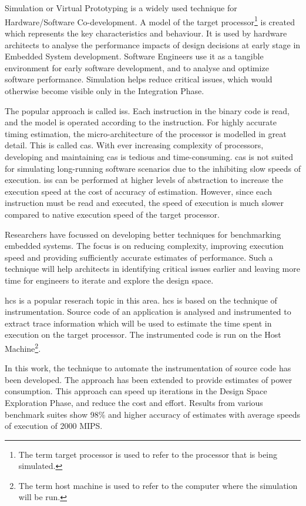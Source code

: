 \chapter{\abstractname}

Simulation or Virtual Prototyping is a widely used technique for Hardware/Software Co-development. A model of the target processor\footnote{The term target processor is used to refer to the processor that is being simulated.} is created which represents the key characteristics and behaviour. It is used by hardware architects to analyse the performance impacts of design decisions at early stage in Embedded System development. Software Engineers use it as a tangible environment for early software development, and to analyse and optimize software performance. Simulation helps reduce critical issues, which would otherwise become visible only in the Integration Phase.

The popular approach is called \gls{iss}. Each instruction in the binary code is read, and the model is operated according to the instruction. For highly accurate timing estimation, the micro-architecture of the processor is modelled in great detail. This is called \gls{cas}. With ever increasing complexity of processors, developing and maintaining \gls{cas} is tedious and time-consuming. \gls{cas} is not suited for simulating long-running software scenarios due to the inhibiting slow speeds of execution. \gls{iss} can be performed at higher levels of abstraction to increase the execution speed at the cost of accuracy of estimation. However, since each instruction must be read and executed, the speed of execution is much slower compared to native execution speed of the target processor.

Researchers have focussed on developing better techniques for benchmarking embedded systems. The focus is on reducing complexity, improving execution speed and providing sufficiently accurate estimates of performance. Such a technique will help architects in identifying critical issues earlier and leaving more time for engineers to iterate and explore the design space.

\gls{hcs} is a popular reserach topic in this area. \gls{hcs} is based on the technique of instrumentation. Source code of an application is analysed and instrumented to extract trace information which will be used to estimate the time spent in execution on the target processor. The instrumented code is run on the Host Machine\footnote{The term host machine is used to refer to the computer where the simulation will be run.}. 

In this work, the technique to automate the instrumentation of source code has been developed. The approach has been extended to provide estimates of power consumption. This approach can speed up iterations in the Design Space Exploration Phase, and reduce the cost and effort. Results from various benchmark suites show 98\% and higher accuracy of estimates with average speeds of execution of 2000 MIPS. 

